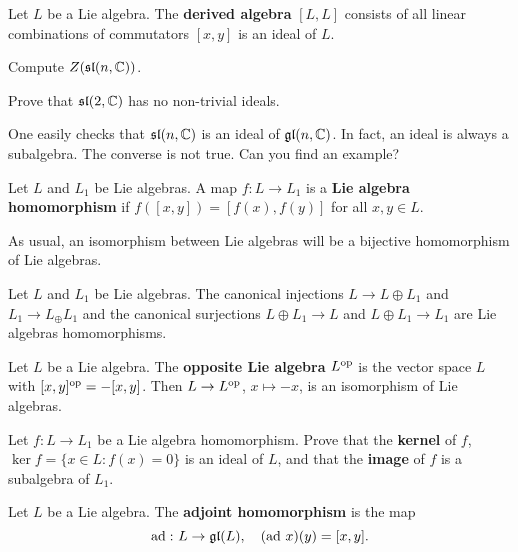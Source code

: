 \begin{example}
    Let $L$ be a Lie algebra. 
    The \textbf{derived algebra} $[L,L]$
    consists of all linear combinations of commutators $[x,y]$ 
    is an ideal of $L$. 
\end{example}

\begin{exercise}
    Compute $Z(\mathfrak{sl}(n,\mathbb{C}))$. 
\end{exercise}

\begin{exercise}
    Prove that $\mathfrak{sl}(2,\mathbb{C})$ has no non-trivial ideals. 
\end{exercise}

One easily checks that $\mathfrak{sl}(n,\mathbb{C})$ is an ideal of $\mathfrak{gl}(n,\mathbb{C})$. In fact, 
an ideal is always a subalgebra. The converse is not true. 
Can you find an example?

\begin{definition}
    Let $L$ and $L_1$ be Lie algebras. A map $f\colon L\to L_1$ is a 
    \textbf{Lie algebra homomorphism} if $f([x,y])=[f(x),f(y)]$ for all
    $x,y\in L$. 
\end{definition}

As usual, an isomorphism between Lie algebras will be
a bijective homomorphism of Lie algebras. 

\begin{example}
    Let $L$ and $L_1$ be Lie algebras. The canonical injections
    $L\to L\oplus L_1$ and $L_1\to L_\oplus L_1$ and
    the canonical surjections $L\oplus L_1\to L$ and 
    $L\oplus L_1\to L_1$ are Lie algebras homomorphisms.  
\end{example}

\begin{example}
    Let $L$ be a Lie algebra. The \textbf{opposite Lie algebra} 
    $L^{\operatorname{op}}$ is the vector space $L$ with 
    $[x,y]^{\operatorname{op}}=-[x,y]$. Then $L\to L^{\operatorname{op}}$, $x\mapsto -x$, 
    is an isomorphism of Lie algebras.
\end{example}

\begin{exercise}
    Let $f\colon L\to L_1$ be a Lie algebra homomorphism. Prove
    that the \textbf{kernel} of $f$, 
    $\ker f=\{x\in L:f(x)=0\}$ is an ideal
    of $L$, and that the \textbf{image} of $f$ 
    is a subalgebra of $L_1$. 
\end{exercise}

\begin{example}
    Let $L$ be a Lie algebra. 
    The \textbf{adjoint homomorphism} is the map 
    \[
    \operatorname{ad}\,\colon L\to\mathfrak{gl}(L),\quad
    (\operatorname{ad}\,x)(y)=[x,y].
    \]
\end{example}

